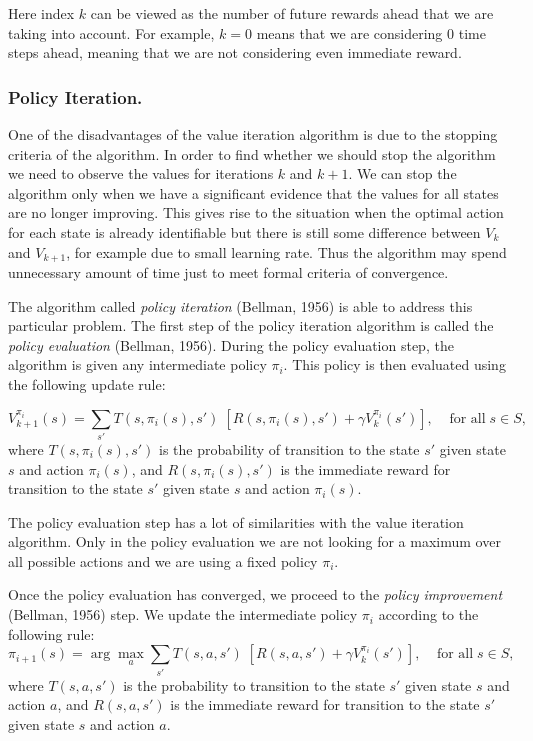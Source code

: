 Here index $k$ can be viewed as the number of future rewards ahead that we are taking into account. For example, $k=0$ means that we are considering 0 time steps ahead, meaning that we are not considering even immediate reward.

\subsubsection{Policy Iteration.}

One of the disadvantages of the value iteration algorithm is due to the stopping criteria of the algorithm. In order to find whether we should stop the algorithm we need to observe the values for iterations $k$ and $k+1$. We can stop the algorithm only when we have a significant evidence that the values for all states are no longer improving. This gives rise to the situation when the optimal action for each state is already identifiable but there is still some difference between $ V_{k} $ and $ V_{k+1} $, for example due to small learning rate. Thus the algorithm may spend unnecessary amount of time just to meet formal criteria of convergence.

The algorithm called \textit{policy iteration} (Bellman, 1956\nocite{bellman1956dynamic}) is able to address this particular problem. The first step of the policy iteration algorithm is called the \textit{policy evaluation} (Bellman, 1956\nocite{bellman1956dynamic}). During the policy evaluation step, the algorithm is given any intermediate policy $ \pi_{i} $. This policy is then evaluated using the following update rule:

$$ V_{k+1}^{\pi_{i}}(s) = \displaystyle\sum_{s'}T(s,\pi_{i}(s),s')\;[R(s,\pi_{i}(s),s')+\gamma V_{k}^{\pi_{i}}(s')], \;\;\;\;\text{for all}\; s \in S, $$
where $ T(s,\pi_{i}(s),s') $ is the probability of transition to the state $s'$ given state $s$ and action $ \pi_{i}(s) $, and $ R(s,\pi_{i}(s),s') $ is the immediate reward for transition to the state $s'$ given state $s$ and action $\pi_{i}(s)$.

The policy evaluation step has a lot of similarities with the value iteration algorithm. Only in the policy evaluation we are not looking for a maximum over all possible actions and we are using a fixed policy $ \pi_{i} $.

Once the policy evaluation has converged, we proceed to the \textit{policy improvement} (Bellman, 1956\nocite{bellman1956dynamic}) step. We update the intermediate policy $ \pi_{i} $ according to the following rule:
$$ \pi_{i+1}(s) = \arg\max_{a}\displaystyle\sum_{s'}T(s,a,s')\;[R(s,a,s')+\gamma V_{k}^{\pi_{i}}(s')], \;\;\;\;\text{for all}\; s \in S, $$
where $ T(s,a,s') $ is the probability to transition to the state $s'$ given state $s$ and action $a$, and $ R(s,a,s') $ is the immediate reward for transition to the state $s'$ given state $s$ and action $a$.


